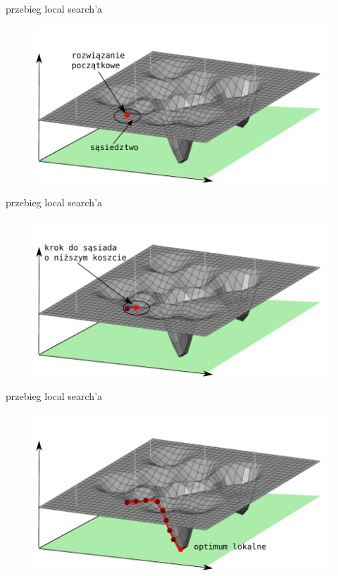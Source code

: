 \documentclass[blue]{beamer}
\begin{document}
\begin{frame}{przebieg local search'a}
\begin{figure}
\includegraphics[scale=.7]{ss2.pdf}
\end{figure}
\end{frame}

\begin{frame}{przebieg local search'a}
\begin{figure}
\includegraphics[scale=.7]{ss3.pdf}
\end{figure}
\end{frame}

\begin{frame}{przebieg local search'a}
\begin{figure}
\includegraphics[scale=.7]{ss4.pdf}
\end{figure}
\end{frame}
\end{document}
